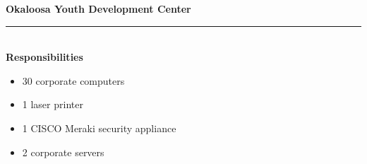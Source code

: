 \textbf{Okaloosa Youth Development Center}
\vspace{2pt}\hrule\hfill\\
\textbf{Responsibilities}
\begin{itemize}[leftmargin=*]
    \item 30 corporate computers
    \item 1 laser printer
    \item 1 CISCO Meraki security appliance
    \item 2 corporate servers
\end{itemize}